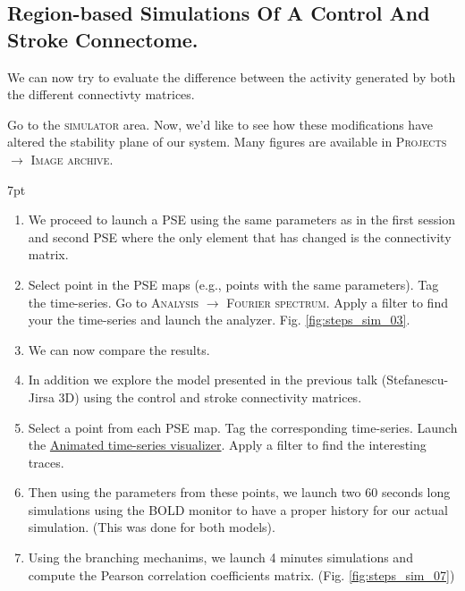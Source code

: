 \documentclass{tufte-handout}
\newenvironment{simulation}{%
  \def\FrameCommand{%
    \hspace{1pt}%
    {\color{ForestGreen}\vrule width 2pt}%
    {\color{simulationshade}\vrule width 4pt}%
    \colorbox{simulationshade}%
  }%
  \MakeFramed{\advance\hsize-\width\FrameRestore}%
  \noindent\hspace{-4.55pt}%
  \begin{adjustwidth}{}{7pt}%
  \vspace{2pt}\vspace{2pt}%
}
{%
  \vspace{2pt}\end{adjustwidth}\endMakeFramed%
}
\begin{document}
\subsection{Region-based Simulations Of A Control And Stroke Connectome.}

\noindent We can now try to evaluate the difference between the activity generated by both the different connectivty matrices. 

Go to the \textsc{simulator} area. Now, we'd like to see how these modifications have altered the stability plane
of our system. Many figures are available in \textsc{Projects} $\rightarrow$ \textsc{Image archive}.

\begin{simulation}
  \begin{enumerate}
  \item We proceed to launch a PSE using the same parameters as in the first session and second PSE where
the only element that has changed is the connectivity matrix.

  \item Select point in the PSE maps (e.g., points with the same parameters). Tag the time-series. Go to \textsc{Analysis} $\rightarrow$ \textsc{Fourier spectrum}. Apply a filter to find your the time-series and launch the analyzer. Fig. \ref{fig:steps_sim_03}.

  \item We can now compare the results.

  \item In addition we explore the model presented in the previous talk (Stefanescu-Jirsa 3D) using the control and stroke connectivity matrices. 
  \item Select a point from each PSE map. Tag the corresponding time-series. Launch the \underline{Animated time-series visualizer}. Apply a filter to find the interesting traces. 

  \item Then using the parameters from these points, we launch two 60 seconds long simulations using the BOLD monitor to have a proper history for our actual simulation. (This was done for both models). 

  \item Using the branching mechanims, we launch 4 minutes simulations and compute the Pearson correlation coefficients matrix. (Fig. \ref{fig:steps_sim_07}) 

  \end{enumerate}
\end{simulation}
\end{document}
